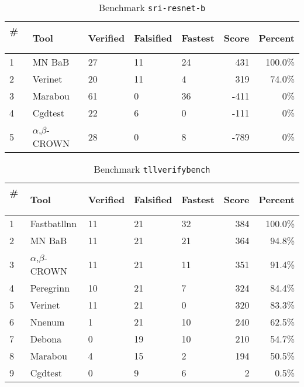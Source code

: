 
\begin{table}[h]
\begin{center}
\caption{Benchmark \texttt{sri-resnet-b}} \label{tab:cat_{cat}}
{\setlength{\tabcolsep}{2pt}
\begin{tabular}[h]{@{}lllllrr@{}}
\toprule
\textbf{\# ~} & \textbf{Tool} & \textbf{Verified} & \textbf{Falsified} & \textbf{Fastest} & \textbf{Score} & \textbf{Percent}\\
\midrule
1 & MN BaB & 27 & 11 & 24 & 431 & 100.0\% \\
2 & Verinet & 20 & 11 & 4 & 319 & 74.0\% \\
3 & Marabou & 61 & 0 & 36 & -411 & 0\% \\
4 & Cgdtest & 22 & 6 & 0 & -111 & 0\% \\
5 & $\alpha$,$\beta$-CROWN & 28 & 0 & 8 & -789 & 0\% \\
\bottomrule
\end{tabular}
}
\end{center}
\end{table}




\begin{table}[h]
\begin{center}
\caption{Benchmark \texttt{tllverifybench}} \label{tab:cat_{cat}}
{\setlength{\tabcolsep}{2pt}
\begin{tabular}[h]{@{}lllllrr@{}}
\toprule
\textbf{\# ~} & \textbf{Tool} & \textbf{Verified} & \textbf{Falsified} & \textbf{Fastest} & \textbf{Score} & \textbf{Percent}\\
\midrule
1 & Fastbatllnn & 11 & 21 & 32 & 384 & 100.0\% \\
2 & MN BaB & 11 & 21 & 21 & 364 & 94.8\% \\
3 & $\alpha$,$\beta$-CROWN & 11 & 21 & 11 & 351 & 91.4\% \\
4 & Peregrinn & 10 & 21 & 7 & 324 & 84.4\% \\
5 & Verinet & 11 & 21 & 0 & 320 & 83.3\% \\
6 & Nnenum & 1 & 21 & 10 & 240 & 62.5\% \\
7 & Debona & 0 & 19 & 10 & 210 & 54.7\% \\
8 & Marabou & 4 & 15 & 2 & 194 & 50.5\% \\
9 & Cgdtest & 0 & 9 & 6 & 2 & 0.5\% \\
\bottomrule
\end{tabular}
}
\end{center}
\end{table}



